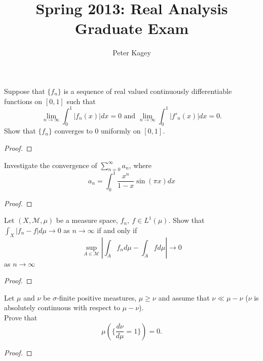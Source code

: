 \documentclass{article}
\newenvironment{problem}[2][Problem]{\begin{trivlist}
\item[\hskip \labelsep {\bfseries #1}\hskip \labelsep {\bfseries #2.}]}{\end{trivlist}}
\begin{document}
\title{Spring 2013: Real Analysis Graduate Exam}
\author{Peter Kagey}

\maketitle

\begin{problem}{1}
  Suppose that $\{ f_n \}$ is a sequence of real valued continuously
  differentiable functions on $[0, 1]$ such that \[
    \lim_{n \rightarrow \infty} \int_0^1 |f_n(x)| dx = 0
    \text{ and }
    \lim_{n \rightarrow \infty} \int_0^1 |f'_n(x)| dx = 0.
  \]
  Show that $\{ f_n \}$ converges to 0 uniformly on $[0, 1]$.
\end{problem}

\begin{proof}
\end{proof}

\pagebreak

\begin{problem}{2}
  Investigate the convergence of $\sum_{n=0}^\infty a_n$, where \[
    a_n = \int_0^1 \frac{x^n}{1 - x}\sin(\pi x) dx
  \]
\end{problem}

\begin{proof}
\end{proof}

\pagebreak

\begin{problem}{3}
  Let $(X, \mathcal{M}, \mu)$ be a measure space, $f_n,\ f \in L^1(\mu)$.
  Show that $\int_X |f_n - f| d\mu \rightarrow 0$ as $n \rightarrow \infty$
  if and only if \[
    \sup_{A\in\mathcal{M}} \left|\int_A f_n d\mu - \int_A f d\mu \right| \rightarrow 0
  \] as $n \rightarrow \infty$
\end{problem}

\begin{proof}
\end{proof}

\pagebreak

\begin{problem}{4}
  Let $\mu$ and $\nu$ be $\sigma$-finite positive meastures, $\mu \geq \nu$
  and assume that $\nu \ll \mu - \nu$ ($\nu$ is absolutely continuous with
  respect to $\mu - \nu$). \\
  Prove that \[
    \mu\left(\{\frac{d\nu}{d\mu} = 1\}\right) = 0.
  \]
\end{problem}

\begin{proof}
\end{proof}
\end{document}
